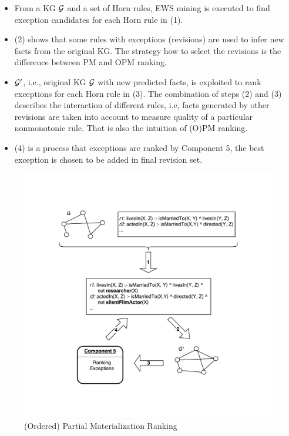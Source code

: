 \begin{itemize}
\item From a KG $\mathcal{G}$ and a set of Horn rules, EWS mining is executed to find exception candidates for each Horn rule in (1).
\item (2) shows that some rules with exceptions (revisions) are used to infer new facts from the original KG. The strategy how to select the revisions is the difference between PM and OPM ranking.
\item $\mathcal{G}'$, i.e., original KG $\mathcal{G}$ with new predicted facts, is exploited to rank exceptions for each Horn rule in (3). The combination of steps (2) and (3) describes the interaction of different rules, i.e, facts generated by other revisions are taken into account to measure quality of a particular nonmonotonic rule. That is also the intuition of (O)PM ranking.
\item (4) is a process that exceptions are ranked by Component 5, the best exception is chosen to be added in final revision set.
\end{itemize}

\begin{figure}[ht]
\centering
\includegraphics[width=1.0\textwidth]{figures/ranking}
\caption{(Ordered) Partial Materialization Ranking}
\label{pm_ranking}
\end{figure}

